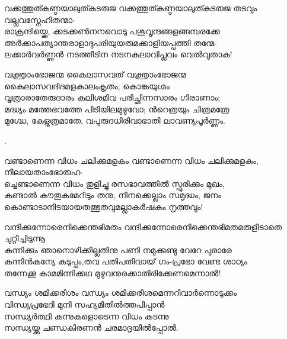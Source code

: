 \begin{enumerate}

\begin{slokam}{\VSr}{\VKG}{വക്കത്തുത്കണ്ഠയാലുത്കടരുജ}
 വക്കത്തുത്കണ്ഠയാലുത്കടരുജ തടവും വല്ലവസ്നേഹിതന്മാ-\\
രാക്രന്ദിയ്ക്കെ, ക്കടക്കൺനനവൊടു പശുവൃന്ദങ്ങളങ്ങമ്പരക്കേ\\
അർക്കാപത്യാന്തരാളാദുപരിയുയരുമക്കാളിയപ്പത്തി തന്മേ-\\
ലക്കാർവർണ്ണൻ നടത്തീടിന നടനകലാവിപ്ലവം വെൽവുതാക!
\end{slokam}




\begin{slokam}{\VSr}{\Unk}{വക്ത്രാംഭോജന്മ കൈലാസവത്}
വക്ത്രാംഭോജന്മ കൈലാസവദിദമളകാലംകൃതം; കൊങ്കയുഗ്മം\\
വൃത്രാരാതേരുദാരം കലിശമിവ പരിച്ഛിന്നസാരം ഗിരാണാം;\\
മദ്ധ്യം മത്തേഭവത്തേ പിടിയിലമുഴുവോ; ൻറെത്രയും ചിത്രമത്രേ\\
മുഗ്ദ്ധേ, കേളുത്രമാതേ, വപുരുദധിരിവാഭാതി ലാവണ്യപൂർണ്ണം.
\end{slokam}


.


\begin{slokam}{\VSv}{\DSN}{വണ്ടാണെന്ന വിധം ചലിക്കുമളകം}
വണ്ടാണെന്ന വിധം ചലിക്കുമളകം, നീലായതാംഭോരുഹ-\\
ച്ചെണ്ടാണെന്ന വിധം തുളിച്ചു രസഭാവത്തിൽ സ്ഫുരിക്കും മുഖം,\\
കണ്ടാൽ കൗതുകമേറിടും തനു, നിനക്കെല്ലാം സമൃദ്ധം, ജനം\\
കൊണ്ടാടാനിടയായതത്ഭുതവുമല്ലാകർഷകം നൃത്തവും! 
\end{slokam}



\begin{slokam}{\VSr}{\Unk}{വന്ദിക്കുന്നോരെനിക്കെന്തഭിമതം}
വന്ദിക്കുന്നോരെനിക്കെന്തഭിമതമരുളീടാതെ ചുറ്റിച്ചിടുന്നൂ\\
കുന്നിക്കും ഞാനൊഴിക്കില്ലതിനു പണി നമുക്കുണ്ടു വേറേ പുരാരേ\\
കുന്നിൻകന്യേ കടുപ്പം,തവ പതിപതിവായ് ഗം-പ്രഭോ വേണ്ട ശാഠ്യം\\
തന്നേക്കൂ കാമമിന്നിക്കഥ മുഴുവനുരക്കാതിരിക്കേണമെന്നാൽ!
\end{slokam}



\begin{slokam}{\VVt}{\Ull}{വന്ധ്യം ശമിക്കരിശം}
വന്ധ്യം ശമിക്കരിശമെന്നറിവാർന്നൊടുക്കം\\
വിന്ധ്യപ്രഭേദി മുനി സഹ്യമിതിൽത്തപിപ്പാൻ\\
സന്ധ്യർത്ഥി കുന്നുകളൊടെന്ന വിധം കടന്നു\\
സന്ധ്യയ്ക്കു ചണ്ഡകിരണൻ ചരമാദൃയിൽപ്പോൽ.
\end{slokam}


\end{enumerate}
